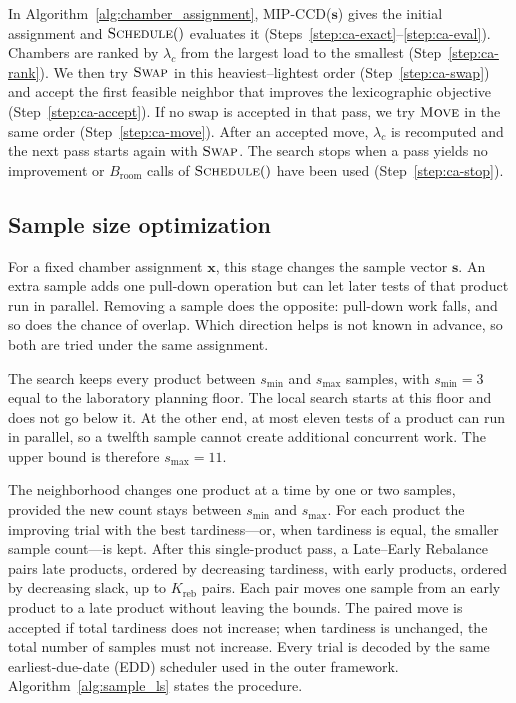 \documentclass[11pt]{article}
\begin{document}
In Algorithm~\ref{alg:chamber_assignment}, MIP-CCD(\(\mathbf{s}\)) gives the initial assignment and \(\textsc{Schedule}()\) evaluates it (Steps~\ref{step:ca-exact}--\ref{step:ca-eval}). Chambers are ranked by \(\lambda_c\) from the largest load to the smallest (Step~\ref{step:ca-rank}). We then try \(\textsc{Swap}\) in this heaviest--lightest order (Step~\ref{step:ca-swap}) and accept the first feasible neighbor that improves the lexicographic objective (Step~\ref{step:ca-accept}). If no swap is accepted in that pass, we try \(\textsc{Move}\) in the same order (Step~\ref{step:ca-move}). After an accepted move, \(\lambda_c\) is recomputed and the next pass starts again with \(\textsc{Swap}\). The search stops when a pass yields no improvement or \(B_{\mathrm{room}}\) calls of \(\textsc{Schedule}()\) have been used (Step~\ref{step:ca-stop}).

\subsection{Sample size optimization}
\label{subsec:sample_optimization}

For a fixed chamber assignment \(\mathbf{x}\), this stage changes the
sample vector \(\mathbf{s}\).
An extra sample adds one pull-down operation but can let later tests
of that product run in parallel.
Removing a sample does the opposite: pull-down work falls, and so
does the chance of overlap.
Which direction helps is not known in advance, so both are tried
under the same assignment.

The search keeps every product between \(s_{\min}\) and \(s_{\max}\)
samples, with \(s_{\min}=3\) equal to the laboratory planning floor.
The local search starts at this floor and does not go below it.
At the other end, at most eleven tests of a product can run in
parallel, so a twelfth sample cannot create additional concurrent
work.
The upper bound is therefore \(s_{\max}=11\).

The neighborhood changes one product at a time by one or two
samples, provided the new count stays between \(s_{\min}\) and
\(s_{\max}\).
For each product the improving trial with the best tardiness---or,
when tardiness is equal, the smaller sample count---is kept.
After this single-product pass, a Late--Early Rebalance pairs late
products, ordered by decreasing tardiness, with early products,
ordered by decreasing slack, up to \(K_{\mathrm{reb}}\) pairs.
Each pair moves one sample from an early product to a late product
without leaving the bounds.
The paired move is accepted if total tardiness does not increase;
when tardiness is unchanged, the total number of samples must not
increase.
Every trial is decoded by the same earliest-due-date (EDD)
scheduler used in the outer framework.
Algorithm~\ref{alg:sample_ls} states the procedure.
\end{document}

